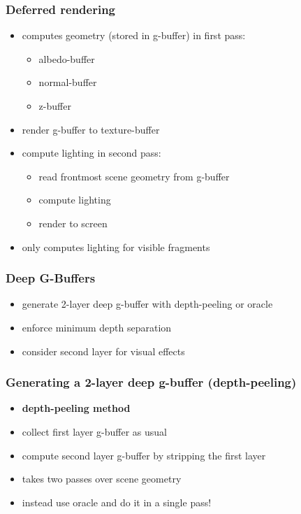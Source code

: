 \documentclass[aspectratio=169]{beamer}
\begin{document}
	\begin{frame}
		\frametitle{Deferred rendering}
		\begin{itemize}
			\item computes geometry (stored in g-buffer) in first pass:
				\begin{itemize}
					\item albedo-buffer
					\item normal-buffer
					\item z-buffer
				\end{itemize}
			\item render g-buffer to texture-buffer
			\item compute lighting in second pass:
				\begin{itemize}
					\item read frontmost scene geometry from g-buffer
					\item compute lighting
					\item render to screen
				\end{itemize}
			\item only computes lighting for visible fragments
		\end{itemize}
	\end{frame}

	\begin{frame}
		\frametitle{Deep G-Buffers}
		\begin{itemize}
			\item generate 2-layer deep g-buffer with depth-peeling or oracle
			\item enforce minimum depth separation
			\item consider second layer for visual effects
		\end{itemize}
	\end{frame}	

	\begin{frame}
		\frametitle{Generating a 2-layer deep g-buffer (depth-peeling)}
		\begin{itemize}
			\item \textbf{depth-peeling method}
			\item collect first layer g-buffer as usual
			\item compute second layer g-buffer by stripping the first layer
			\item takes two passes over scene geometry\pause
			\item instead use oracle and do it in a single pass!
		\end{itemize}
	\end{frame}	
\end{document}
